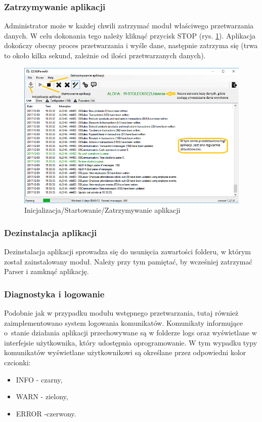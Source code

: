 \documentclass[a4paper]{book}
\begin{document}
\subsubsection{Zatrzymywanie aplikacji}
Administrator może w każdej chwili zatrzymać moduł właściwego przetwarzania danych. W celu dokonania tego należy kliknąć przycisk STOP (rys. \ref{fig:zatrzymywanie_aplikacji}). Aplikacja dokończy obecny proces przetwarzania i wyśle dane, następnie zatrzyma się (trwa to około kilka sekund, zależnie od ilości przetwarzanych danych).
\begin{figure}[t]
	\centering
	\hspace*{-4.5cm}\includegraphics{./img/zatrzymywanie_aplikacji.png}
	\caption{Inicjalizacja/Startowanie/Zatrzymywanie aplikacji}
	\label{fig:zatrzymywanie_aplikacji}
\end{figure}
\subsubsection{Dezinstalacja aplikacji}
Dezinstalacja aplikacji sprowadza się do usunięcia zawartości folderu, w którym został zainstalowany moduł. Należy przy tym pamiętać, by wcześniej zatrzymać Parser i zamknąć aplikację.
\subsubsection{Diagnostyka i logowanie}
Podobnie jak w przypadku modułu wstępnego przetwarzania, tutaj również zaimplementowano system logowania komunikatów. Komunikaty informujące o~stanie działania aplikacji przechowywane są w folderze logs oraz wyświetlane w interfejsie użytkownika, który udostępnia oprogramowanie. W tym wypadku typy komunikatów wyświetlane użytkownikowi są określane przez odpowiedni kolor czcionki:
 \begin{itemize}
 	\item INFO - czarny,
 	\item WARN - zielony,
 	\item ERROR -czerwony.
 \end{itemize}
\end{document}
